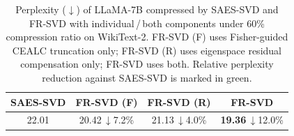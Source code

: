 \begin{table}[tbp]
\centering
\small
\setlength{\tabcolsep}{1.5pt}
\renewcommand{\arraystretch}{1.10}
\begin{tabular}{@{}cccc@{}}
\toprule
SAES-SVD & FR-SVD (F) & FR-SVD (R) & FR-SVD \\
\midrule
22.01
 & 20.42\,\textcolor{mygreen}{$\downarrow$7.2\%}
 & 21.13\,\textcolor{mygreen}{$\downarrow$4.0\%}
 & \textbf{19.36}\,\textcolor{mygreen}{$\downarrow$12.0\%} \\
\bottomrule
\end{tabular}
\caption{Perplexity ($\downarrow$) of LLaMA-7B compressed by SAES-SVD and
FR-SVD with individual\,/\,both components under 60\% compression ratio on
WikiText-2. FR-SVD (F) uses Fisher-guided CEALC truncation only; FR-SVD (R)
uses eigenspace residual compensation only; FR-SVD uses both.
Relative perplexity reduction against SAES-SVD is marked in
\textcolor{mygreen}{green}.}
\label{tab:ablation-components}
\end{table}
